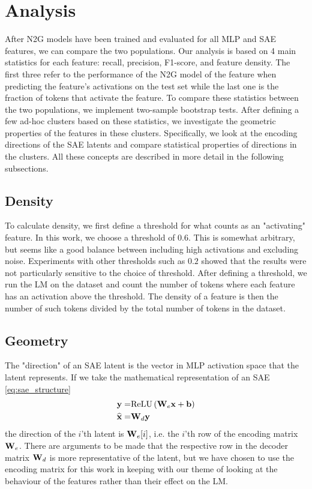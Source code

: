 \section{Analysis}
After \ac{N2G} models have been trained and evaluated for all \ac{MLP} and \ac{SAE} features, we can compare the two populations.
Our analysis is based on 4 main statistics for each feature: recall, precision, F1-score, and feature density.
The first three refer to the performance of the \ac{N2G} model of the feature when predicting the feature's activations on the test set while the last one is the fraction of tokens that activate the feature.
To compare these statistics between the two populations, we implement two-sample bootstrap tests.
After defining a few ad-hoc clusters based on these statistics, we investigate the geometric properties of the features in these clusters.
Specifically, we look at the encoding directions of the \ac{SAE} latents and compare statistical properties of directions in the clusters.
All these concepts are described in more detail in the following subsections.

\subsection{Density}
\label{sec:density}
To calculate density, we first define a threshold for what counts as an "activating" feature.
In this work, we choose a threshold of $0.6$.
This is somewhat arbitrary, but seems like a good balance between including high activations and excluding noise.
Experiments with other thresholds such as $0.2$ showed that the results were not particularly sensitive to the choice of threshold.
After defining a threshold, we run the \ac{LM} on the dataset and count the number of tokens where each feature has an activation above the threshold.
The density of a feature is then the number of such tokens divided by the total number of tokens in the dataset.

\subsection{Geometry}
\label{sec:methods_geometry}
The "direction" of an \ac{SAE} latent is the vector in \ac{MLP} activation space that the latent represents.
If we take the mathematical representation of an \ac{SAE} \eqref{eq:sae_structure} 
\begin{align*}
    \mathbf{y}=&\mathrm{ReLU}\left(\mathbf{W}_e\mathbf{x}+\mathbf{b}\right)\\
    \widehat{\mathbf{x}}=&\mathbf{W}_d\mathbf{y}
\end{align*}
the direction of the $i$'th latent is $\mathbf{W}_e[i]$, i.e. the $i$'th row of the encoding matrix $\mathbf{W}_e$.
There are arguments to be made \parencite{nanda_open_2023} that the respective row in the decoder matrix $\mathbf{W}_d$ is more representative of the latent, but we have chosen to use the encoding matrix for this work in keeping with our theme of looking at the behaviour of the features rather than their effect on the \ac{LM}.

